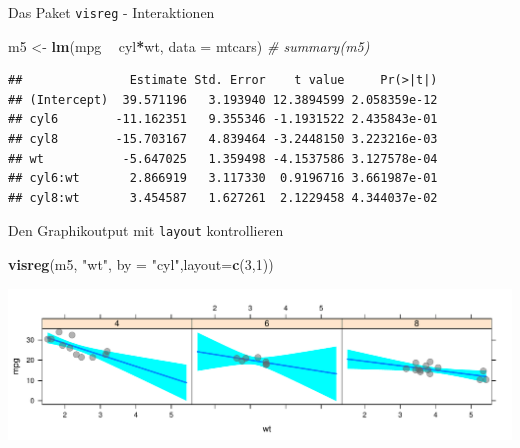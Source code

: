 \documentclass[ignorenonframetext,]{beamer}
\newenvironment{Shaded}{\begin{snugshade}}{\end{snugshade}}
\newcommand{\KeywordTok}[1]{\textcolor[rgb]{0.13,0.29,0.53}{\textbf{#1}}}
\newcommand{\DataTypeTok}[1]{\textcolor[rgb]{0.13,0.29,0.53}{#1}}
\newcommand{\DecValTok}[1]{\textcolor[rgb]{0.00,0.00,0.81}{#1}}
\newcommand{\StringTok}[1]{\textcolor[rgb]{0.31,0.60,0.02}{#1}}
\newcommand{\CommentTok}[1]{\textcolor[rgb]{0.56,0.35,0.01}{\textit{#1}}}
\newcommand{\OperatorTok}[1]{\textcolor[rgb]{0.81,0.36,0.00}{\textbf{#1}}}
\newcommand{\NormalTok}[1]{#1}
\begin{document}
\begin{frame}[fragile]{Das Paket \texttt{visreg} - Interaktionen}

\begin{Shaded}
\begin{Highlighting}[]
\NormalTok{m5 <-}\StringTok{ }\KeywordTok{lm}\NormalTok{(mpg }\OperatorTok{~}\StringTok{ }\NormalTok{cyl}\OperatorTok{*}\NormalTok{wt, }\DataTypeTok{data =}\NormalTok{ mtcars)}
\CommentTok{# summary(m5)}
\end{Highlighting}
\end{Shaded}

\begin{verbatim}
##               Estimate Std. Error    t value     Pr(>|t|)
## (Intercept)  39.571196   3.193940 12.3894599 2.058359e-12
## cyl6        -11.162351   9.355346 -1.1931522 2.435843e-01
## cyl8        -15.703167   4.839464 -3.2448150 3.223216e-03
## wt           -5.647025   1.359498 -4.1537586 3.127578e-04
## cyl6:wt       2.866919   3.117330  0.9196716 3.661987e-01
## cyl8:wt       3.454587   1.627261  2.1229458 4.344037e-02
\end{verbatim}

\end{frame}

\begin{frame}[fragile]{Den Graphikoutput mit \texttt{layout}
kontrollieren}

\begin{Shaded}
\begin{Highlighting}[]
\KeywordTok{visreg}\NormalTok{(m5, }\StringTok{"wt"}\NormalTok{, }\DataTypeTok{by =} \StringTok{"cyl"}\NormalTok{,}\DataTypeTok{layout=}\KeywordTok{c}\NormalTok{(}\DecValTok{3}\NormalTok{,}\DecValTok{1}\NormalTok{))}
\end{Highlighting}
\end{Shaded}

\includegraphics{B3_linreg_files/figure-beamer/unnamed-chunk-40-1.pdf}

\end{frame}
\end{document}
